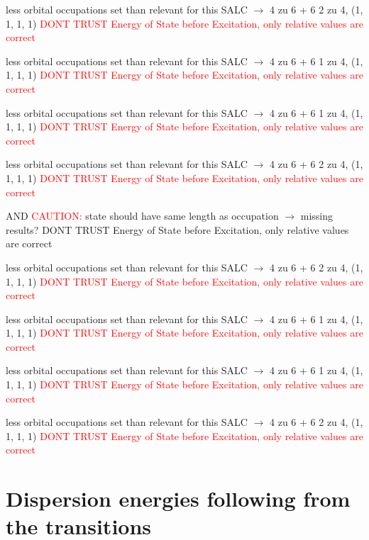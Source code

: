 \documentclass[12pt,a4paper]{article}
\begin{document}
less orbital occupations set than relevant for this SALC $\rightarrow$ 
4 zu 6 + 6 
2 zu 4, (1, 1, 1, 1) 
\textcolor{red}{DONT TRUST \glqq{}Energy of State before Excitation\grqq{}, only relative values are correct}

less orbital occupations set than relevant for this SALC $\rightarrow$ 
4 zu 6 + 6 
1 zu 4, (1, 1, 1, 1) 
\textcolor{red}{DONT TRUST \glqq{}Energy of State before Excitation\grqq{}, only relative values are correct}

less orbital occupations set than relevant for this SALC $\rightarrow$ 
4 zu 6 + 6 
1 zu 4, (1, 1, 1, 1) 
\textcolor{red}{DONT TRUST \glqq{}Energy of State before Excitation\grqq{}, only relative values are correct}

less orbital occupations set than relevant for this SALC $\rightarrow$ 
4 zu 6 + 6 
2 zu 4, (1, 1, 1, 1) 
\textcolor{red}{DONT TRUST \glqq{}Energy of State before Excitation\grqq{}, only relative values are correct}

 AND 	\textcolor{red}{CAUTION:} state should have same length as occupation $\rightarrow$ missing results?
	DONT TRUST \glqq{}Energy of State before Excitation\grqq{}, only relative values are correct

less orbital occupations set than relevant for this SALC $\rightarrow$ 
4 zu 6 + 6 
2 zu 4, (1, 1, 1, 1) 
\textcolor{red}{DONT TRUST \glqq{}Energy of State before Excitation\grqq{}, only relative values are correct}

less orbital occupations set than relevant for this SALC $\rightarrow$ 
4 zu 6 + 6 
1 zu 4, (1, 1, 1, 1) 
\textcolor{red}{DONT TRUST \glqq{}Energy of State before Excitation\grqq{}, only relative values are correct}

less orbital occupations set than relevant for this SALC $\rightarrow$ 
4 zu 6 + 6 
1 zu 4, (1, 1, 1, 1) 
\textcolor{red}{DONT TRUST \glqq{}Energy of State before Excitation\grqq{}, only relative values are correct}

less orbital occupations set than relevant for this SALC $\rightarrow$ 
4 zu 6 + 6 
2 zu 4, (1, 1, 1, 1) 
\textcolor{red}{DONT TRUST \glqq{}Energy of State before Excitation\grqq{}, only relative values are correct}


\newpage \section*{Dispersion energies following from the transitions}
\end{document}

